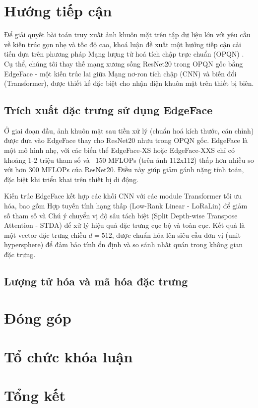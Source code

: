 \section{Hướng tiếp cận}
Để giải quyết bài toán truy xuất ảnh khuôn mặt trên tập dữ liệu lớn với yêu cầu về kiến trúc gọn nhẹ và tốc độ cao, khoá luận đề xuất một hướng tiếp cận cải tiến dựa trên phương pháp Mạng lượng tử hoá tích chập trực chuẩn (OPQN) \cite{opqn}. Cụ thể, chúng tôi thay thế mạng xương sống ResNet20 trong OPQN gốc bằng EdgeFace - một kiến trúc lai giữa Mạng nơ-ron tích chập (CNN) và biến đổi (Transformer), được thiết kế đặc biệt cho nhận diện khuôn mặt trên thiết bị biên.

\subsection{Trích xuất đặc trưng sử dụng EdgeFace}
Ở giai đoạn đầu, ảnh khuôn mặt sau tiền xử lý (chuẩn hoá kích thước, căn chỉnh) được đưa vào EdgeFace thay cho ResNet20 nhưu trong OPQN gốc. EdgeFace là một mô hình nhẹ, với các biến thể EdgeFace-XS hoặc EdgeFace-XXS chỉ có khoảng 1-2 triệu tham số và ~150 MFLOPs (trên ảnh 112x112) thấp hơn nhiều so với hơn 300 MFLOPs của ResNet20. Điều này giúp giảm gánh nặng tính toán, đặc biệt khi triển khai trên thiết bị di động. 

Kiến trúc EdgeFace kết hợp các khối CNN với các module Transformer tối ưu hóa, bao gồm Hợp tuyến tính hạng thấp (Low-Rank Linear - LoRaLin) để giảm số tham số và Chú ý chuyển vị độ sâu tách biệt (Split Depth-wise Transpose Attention - STDA) để xử lý hiệu quả đặc trưng cục bộ và toàn cục. Kết quả là một vector đặc trưng chiều $ d = 512 $, được chuẩn hóa lên siêu cầu đơn vị (unit hypersphere) để đảm bảo tính ổn định và so sánh nhất quán trong không gian đặc trưng.

\subsection{Lượng tử hóa và mã hóa đặc trưng}

\section{Đóng góp}
\section{Tổ chức khóa luận}
\section{Tổng kết}


